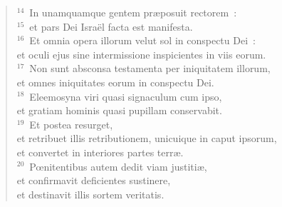 \begin{verse}
${}^{14}$~In unamquamque gentem pr\ae posuit rectorem~:\\
${}^{15}$~et pars Dei Isra\"el facta est manifesta.\\
${}^{16}$~Et omnia opera illorum velut sol in conspectu Dei~:\\ et oculi ejus sine intermissione inspicientes in viis eorum.\\
${}^{17}$~Non sunt absconsa testamenta per iniquitatem illorum,\\ et omnes iniquitates eorum in conspectu Dei.\\
${}^{18}$~Eleemosyna viri quasi signaculum cum ipso,\\ et gratiam hominis quasi pupillam conservabit.\\
${}^{19}$~Et postea resurget,\\ et retribuet illis retributionem, unicuique in caput ipsorum,\\ et convertet in interiores partes terr\ae .\\
${}^{20}$~Pœnitentibus autem dedit viam justiti\ae ,\\ et confirmavit deficientes sustinere,\\ et destinavit illis sortem veritatis.\end{verse}



